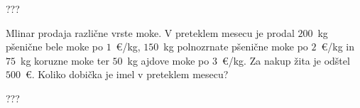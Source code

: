 \documentclass[addpoints,12pt]{exam}
\begin{document}
\begin{questions}
    \begin{solution}[6cm]
        ???
            \end{solution}
        
    \question[3]
    Mlinar prodaja različne vrste moke. V preteklem mesecu je prodal $200$~kg pšenične bele moke po $1$~\euro/kg, $150$~kg polnozrnate pšenične moke po $2$~\euro/kg in 
    $75$~kg koruzne moke ter $50$~kg ajdove moke po $3$~\euro/kg. Za nakup žita je odštel $500$~\euro. Koliko dobička je imel v preteklem mesecu?

    \begin{solution}[5cm]
        ???
            \end{solution}

    

\end{questions}
\end{document}
